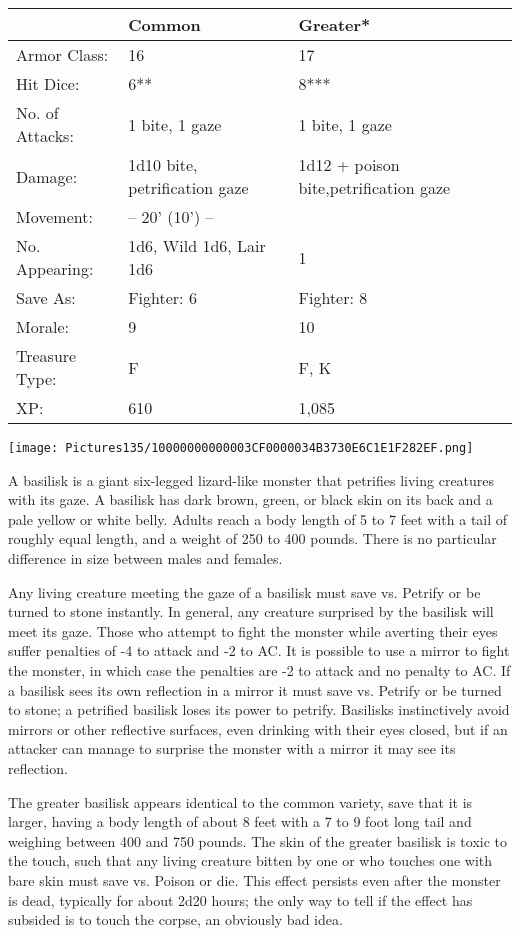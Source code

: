\documentclass[a4paper,twoside,openany,10pt]{book}
\begin{document}
\begin{multicols}{2}
\begin{tabularx}{0.48\textwidth}{lXX}
& Common & Greater* \\\hline
Armor Class: & 16 & 17 \\\hline
Hit Dice: & 6** & 8*** \\\hline
No. of Attacks: & 1 bite, 1 gaze & 1 bite, 1 gaze \\\hline
Damage: & 1d10 bite, petrification gaze & 1d12 + poison bite,petrification gaze \\\hline
Movement: & -- 20' (10') -- & \\\hline
No. Appearing: & 1d6, Wild 1d6, Lair 1d6 & 1 \\\hline
Save As: & Fighter: 6 & Fighter: 8 \\\hline
Morale: & 9 & 10 \\\hline
Treasure Type: & F & F, K \\\hline
XP: & 610 & 1,085 \\\hline
\end{tabularx}\medskip


\begin{center}
	\texttt{[image: Pictures135/10000000000003CF0000034B3730E6C1E1F282EF.png]}
\end{center}

A basilisk is a giant six-legged lizard-like monster that petrifies living creatures with its gaze. A basilisk has dark brown, green, or black skin on its back and a pale yellow or white belly. Adults reach a body length of 5 to 7 feet with a tail of roughly equal length, and a weight of 250 to 400 pounds. There is no particular difference in size between males and females.

Any living creature meeting the gaze of a basilisk must save vs. Petrify or be turned to stone instantly. In general, any creature surprised by the basilisk will meet its gaze. Those who attempt to fight the monster while averting their eyes suffer penalties of -4 to attack and -2 to AC. It is possible to use a mirror to fight the monster, in which case the penalties are -2 to attack and no penalty to AC. If a basilisk sees its own reflection in a mirror it must save vs. Petrify or be turned to stone; a petrified basilisk loses its power to petrify. Basilisks instinctively avoid mirrors or other reflective surfaces, even drinking with their eyes closed, but if an attacker can manage to surprise the monster with a mirror it may see its reflection.

The greater basilisk appears identical to the common variety, save that it is larger, having a body length of about 8 feet with a 7 to 9 foot long tail and weighing between 400 and 750 pounds. The skin of the greater basilisk is toxic to the touch, such that any living creature bitten by one or who touches one with bare skin must save vs. Poison or die. This effect persists even after the monster is dead, typically for about 2d20 hours; the only way to tell if the effect has subsided is to touch the corpse, an obviously bad idea.


\end{multicols}
\end{document}
